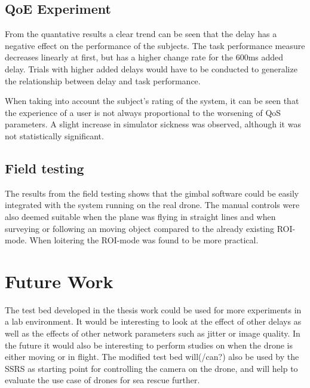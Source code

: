 \documentclass[nofilelist]{cslthse-msc}
\begin{document}
\section{QoE Experiment}
From the quantative results a clear trend can be seen that the delay has a negative effect on the performance of the subjects. The task performance measure decreases linearly at first, but has a higher change rate for the 600ms added delay. Trials with higher added delays would have to be conducted to generalize the relationship between delay and task performance.

When taking into account the subject's rating of the system, it can be seen that the experience of a user is not always proportional to the worsening of QoS parameters. A slight increase in simulator sickness was observed, although it was not statistically significant.

\section{Field testing}
The results from the field testing shows that the gimbal software could be easily integrated with the system running on the real drone. The manual controls were also deemed suitable when the plane was flying in straight lines and when surveying or following an moving object compared to the already existing ROI-mode. When loitering the ROI-mode was found to be more practical.

\chapter{Future Work}
The test bed developed in the thesis work could be used for more experiments in a lab environment. It would be interesting to look at the effect of other delays as well as the effects of other network parameters such as jitter or image quality. In the future it would also be interesting to perform studies on when the drone is either moving or in flight.
The modified test bed will(/can?) also be used by the SSRS as starting point for controlling the camera on the drone, and will help to evaluate the use case of drones for sea rescue further.

{}
\end{document}
